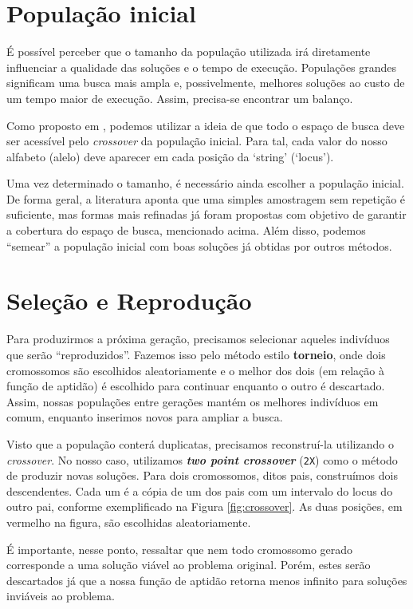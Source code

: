 \documentclass[11pt]{article}
\begin{document}
\section{População inicial}
\label{sec:org7eb563e}
É possível perceber que o tamanho da população utilizada irá diretamente influenciar a qualidade das soluções e o tempo de execução. Populações grandes significam uma busca mais ampla e, possivelmente, melhores soluções ao custo de um tempo maior de execução. Assim, precisa-se encontrar um balanço.

Como proposto em \cite{bib:genetic-algorithm}, podemos utilizar a ideia de que todo o espaço de busca deve ser acessível pelo \emph{crossover} da população inicial. Para tal, cada valor do nosso alfabeto (alelo) deve aparecer em cada posição da ‘string’ (‘locus’).

Uma vez determinado o tamanho, é necessário ainda escolher a população inicial. De forma geral, a literatura aponta que uma simples amostragem sem repetição é suficiente, mas formas mais refinadas já foram propostas com objetivo de garantir a cobertura do espaço de busca, mencionado acima. Além disso, podemos ``semear'' a população inicial com boas soluções já obtidas por outros métodos.

\section{Seleção e Reprodução}
\label{sec:org9a82437}
Para produzirmos a próxima geração, precisamos selecionar aqueles indivíduos que serão ``reproduzidos''. Fazemos isso pelo método estilo \textbf{torneio}, onde dois cromossomos são escolhidos aleatoriamente e o melhor dos dois (em relação à função de aptidão) é escolhido para continuar enquanto o outro é descartado. Assim, nossas populações entre gerações mantém os melhores indivíduos em comum, enquanto inserimos novos para ampliar a busca.

Visto que a população conterá duplicatas, precisamos reconstruí-la utilizando o \emph{crossover}. No nosso caso, utilizamos \textbf{\emph{two point crossover}} (\texttt{2X}) como o método de produzir novas soluções. Para dois cromossomos, ditos pais, construímos dois descendentes. Cada um é a cópia de um dos pais com um intervalo do locus do outro pai, conforme exemplificado na Figura \ref{fig:crossover}. As duas posições, em vermelho na figura, são escolhidas aleatoriamente.

É importante, nesse ponto, ressaltar que nem todo cromossomo gerado corresponde a uma solução viável ao problema original. Porém, estes serão descartados já que a nossa função de aptidão retorna menos infinito para soluções inviáveis ao problema.
\end{document}
